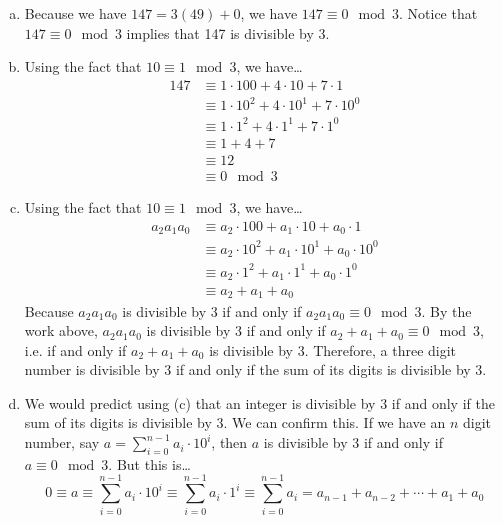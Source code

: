 \documentclass[11pt,letterpaper]{article}
\begin{document}
\sol 
\begin{enumerate}[(a)]
\item Because we have $147= 3(49) + 0$, we have $147 \equiv 0 \mod 3$. Notice that $147 \equiv 0 \mod 3$ implies that 147 is divisible by 3. \pspace

\item Using the fact that $10 \equiv 1 \mod 3$, we have\dots
	\[
	\begin{aligned}
	147 &\equiv 1 \cdot 100 + 4 \cdot 10 + 7 \cdot 1 \\[0.3cm]
	&\equiv 1 \cdot 10^2 + 4 \cdot 10^1 + 7 \cdot 10^0 \\[0.3cm]
	&\equiv 1 \cdot 1^2 + 4 \cdot 1^1 + 7 \cdot 1^0 \\[0.3cm]
	&\equiv 1 + 4 + 7 \\[0.3cm]
	&\equiv 12 \\[0.3cm]
	&\equiv 0 \mod 3
	\end{aligned}
	\] \pspace

\item Using the fact that $10 \equiv 1 \mod 3$, we have\dots
	\[
	\begin{aligned}
	a_2a_1a_0&\equiv a_2 \cdot 100 + a_1 \cdot 10 + a_0 \cdot 1 \\[0.3cm]
	&\equiv a_2 \cdot 10^2 + a_1 \cdot 10^1 + a_0 \cdot 10^0 \\[0.3cm]
	&\equiv a_2 \cdot 1^2 + a_1 \cdot 1^1 + a_0 \cdot 1^0 \\[0.3cm]
	&\equiv a_2 + a_1 + a_0
	\end{aligned}
	\] 
Because $a_2a_1a_0$ is divisible by 3 if and only if $a_2a_1a_0 \equiv 0 \mod 3$. By the work above, $a_2a_1a_0$ is divisible by 3 if and only if $a_2 + a_1 + a_0 \equiv 0 \mod 3$, i.e. if and only if $a_2 + a_1 + a_0$ is divisible by 3. Therefore, a three digit number is divisible by 3 if and only if the sum of its digits is divisible by 3. 

\item We would predict using (c) that an integer is divisible by 3 if and only if the sum of its digits is divisible by 3. We can confirm this. If we have an $n$ digit number, say $a= \sum_{i=0}^{n-1} a_i \cdot 10^i$, then $a$ is divisible by 3 if and only if $a \equiv 0 \mod 3$. But this is\dots
	\[
	0 \equiv a \equiv \sum_{i=0}^{n-1} a_i \cdot 10^i \equiv \sum_{i=0}^{n-1} a_i \cdot 1^i \equiv \sum_{i=0}^{n-1} a_i= a_{n-1} + a_{n-2} + \cdots + a_1 + a_0
	\]
\end{enumerate}
\end{document}
